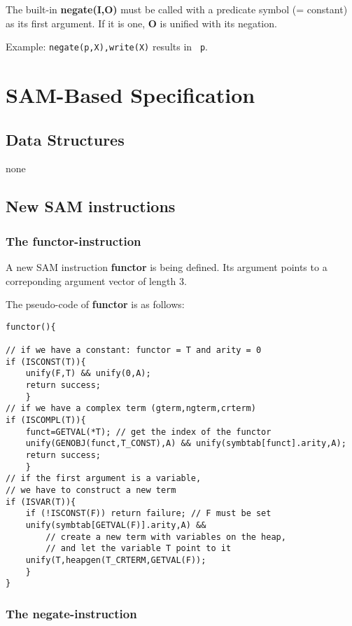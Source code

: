 The built-in {\bf negate(I,O)} must be called with a predicate symbol
(= constant) as its first argument. If it is one, {\bf O} is unified
with its negation.

Example: {\tt negate(p,X),write(X)} results in {\tt ~p}.


\section{SAM-Based Specification}

\subsection{Data Structures}

none

\subsection{New SAM instructions}

\subsubsection{The functor-instruction}

A new SAM instruction {\bf functor} is being defined. Its argument
points to a correponding argument vector of length 3.

The pseudo-code of {\bf functor} is as follows:

\begin{verbatim}
functor(){

// if we have a constant: functor = T and arity = 0
if (ISCONST(T)){
	unify(F,T) && unify(0,A);
	return success;
	}
// if we have a complex term (gterm,ngterm,crterm)
if (ISCOMPL(T)){
	funct=GETVAL(*T); // get the index of the functor
	unify(GENOBJ(funct,T_CONST),A) && unify(symbtab[funct].arity,A);
	return success;
	}
// if the first argument is a variable,
// we have to construct a new term
if (ISVAR(T)){
	if (!ISCONST(F)) return failure; // F must be set
	unify(symbtab[GETVAL(F)].arity,A) &&
		// create a new term with variables on the heap,
		// and let the variable T point to it
	unify(T,heapgen(T_CRTERM,GETVAL(F)); 
	}
}
\end{verbatim}


\subsubsection{The negate-instruction}

